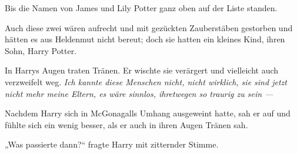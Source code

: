 Bis die Namen von James und Lily Potter ganz oben auf der Liste standen.

Auch diese zwei wären aufrecht und mit gezückten Zauberstäben gestorben und hätten es aus Heldenmut nicht bereut; doch sie hatten ein kleines Kind, ihren Sohn, Harry Potter.

In Harrys Augen traten Tränen. Er wischte sie verärgert und vielleicht auch verzweifelt weg. \emph{Ich kannte diese Menschen nicht, nicht wirklich, sie sind \emph{jetzt} nicht mehr meine Eltern, es wäre sinnlos, ihretwegen so traurig zu sein —}

Nachdem Harry sich in McGonagalls Umhang ausgeweint hatte, sah er auf und fühlte sich ein wenig besser, als er auch in ihren Augen Tränen sah.

„Was passierte dann?“ fragte Harry mit zitternder Stimme.

